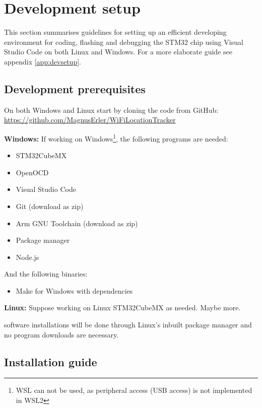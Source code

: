 \section{Development setup} \label{sec:dev-setup}
This section summarises guidelines for setting up an efficient developing environment for coding, flashing and debugging the STM32 chip using Visual Studio Code on both Linux and Windows. For a more elaborate guide see appendix \ref{app:devsetup}.

\subsection{Development prerequisites}
On both Windows and Linux start by cloning the code from GitHub: \url{https://github.com/MagnusErler/WiFiLocationTracker}

\textbf{Windows:}
If working on Windows\footnote{\ac{WSL} can not be used, as peripheral access (\ac{USB} access) is not implemented in WSL2}, the following programs are needed:
\begin{itemize}
    \item STM32CubeMX 
    \item OpenOCD 
    \item Visual Studio Code 
    \item Git (download as zip) 
    \item Arm GNU Toolchain (download as zip) 
    \item Package manager 
    \item Node.js
\end{itemize}

And the following binaries:
\begin{itemize}
    \item Make for Windows with dependencies 
\end{itemize}

\textbf{Linux:}
Suppose working on Linux STM32CubeMX as needed. Maybe more.

software installations will be done through Linux's inbuilt package manager and no program downloads are necessary.

\subsection{Installation guide}


